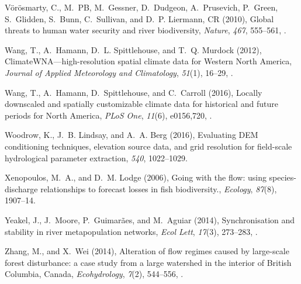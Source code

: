 \documentclass[draft,linenumbers]{AGUJournal}
\begin{document}
\begin{thebibliography}{38}
V{\"o}r{\"o}smarty, C., M.~{PB}, M.~Gessner, D.~Dudgeon, A.~Prusevich,
  P.~Green, S.~Glidden, S.~Bunn, C.~Sullivan, and D.~P. Liermann, {CR} (2010),
  Global threats to human water security and river biodiversity,
  \textit{Nature}, \textit{467}, 555--561, .

Wang, T., A.~Hamann, D.~L. Spittlehouse, and T.~Q. Murdock (2012),
  {ClimateWNA}---high-resolution spatial climate data for {W}estern {N}orth {A}merica,
  \textit{Journal of Applied Meteorology and Climatology}, \textit{51}(1),
  16--29, .

Wang, T., A.~Hamann, D.~Spittlehouse, and C.~Carroll (2016), Locally downscaled
  and spatially customizable climate data for historical and future periods for
  {North America}, \textit{PLoS One}, \textit{11}(6), e0156,720,
  .

Woodrow, K., J.~B. Lindsay, and A.~A. Berg (2016), Evaluating {DEM}
  conditioning techniques, elevation source data, and grid resolution for
  field-scale hydrological parameter extraction, \textit{540}, 1022--1029.

Xenopoulos, M.~A., and D.~M. Lodge (2006), Going with the flow: using
  species-discharge relationships to forecast losses in fish biodiversity.,
  \textit{Ecology}, \textit{87}(8), 1907--14.

Yeakel, J., J.~Moore, P.~Guimar{\~a}es, and M.~Aguiar (2014), Synchronisation
  and stability in river metapopulation networks, \textit{Ecol Lett},
  \textit{17}(3), 273--283, .

Zhang, M., and X.~Wei (2014), Alteration of flow regimes caused by
  large{-}scale forest disturbance: a case study from a large watershed in the
  interior of {British Columbia, Canada}, \textit{Ecohydrology}, \textit{7}(2),
  544--556, .

\end{thebibliography}
\end{document}
